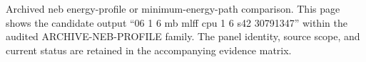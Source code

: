 Archived neb energy-profile or minimum-energy-path comparison. This page shows the candidate output ``06 1 6 mb mlff cpu 1 6 s42 30791347'' within the audited ARCHIVE-NEB-PROFILE family. The panel identity, source scope, and current status are retained in the accompanying evidence matrix.
